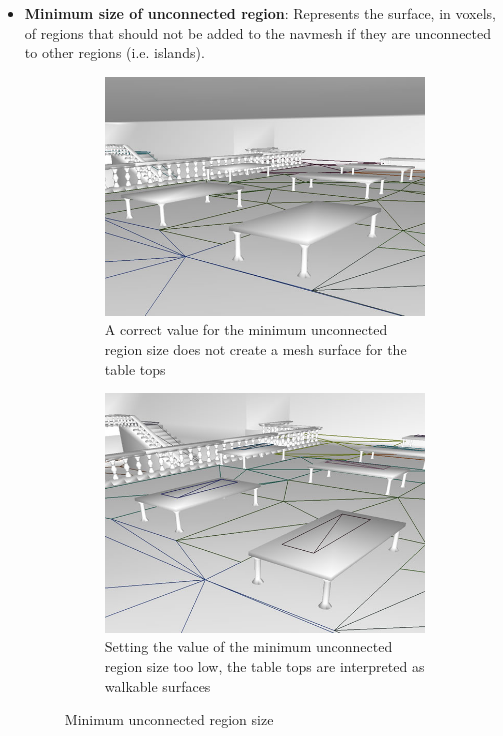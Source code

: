 \begin{itemize}
  
  \item\textbf{Minimum size of unconnected region}: Represents the surface, in voxels, of regions that should not be added to the navmesh if they are unconnected to other regions (i.e. islands).
  
  

\begin{figure}[H]
        \centering
        \begin{subfigure}[b]{0.49\textwidth}
                \centering
                \includegraphics[width=\textwidth]{../images/min_unconn_region_0.png}
                \caption{A correct value for the minimum unconnected region size does not create a mesh surface for the table tops}
        \end{subfigure}
        \begin{subfigure}[b]{0.49\textwidth}
                \centering
                \includegraphics[width=\textwidth]{../images/min_unconn_region_1.png}
                \caption{Setting the value of the minimum unconnected region size too low, the table tops are interpreted as walkable surfaces}
        \end{subfigure}
        \caption{Minimum unconnected region size}
	\end{figure}        



\end{itemize}
